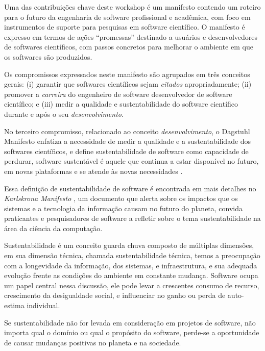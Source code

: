 Uma das contribuições chave deste workshop é um manifesto contendo um roteiro
para o futuro da engenharia de software profissional e acadêmica, com foco em
instrumentos de suporte para pesquisas em software científico. O manifesto é
expresso em termos de ações ``promessas'' destinado a usuários e
desenvolvedores de softwares científicos, com passos concretos para melhorar o
ambiente em que os softwares são produzidos.

Os compromissos expressados neste manifesto são agrupados em três conceitos gerais:
(i) garantir que softwares científicos sejam {\it citados} apropriadamente;
(ii) promover a {\it carreira} do engenheiro de software desenvolvedor de software científico; e
(iii) medir a qualidade e sustentabilidade do software científico durante e após o seu {\it desenvolvimento}.

No terceiro compromisso, relacionado ao conceito {\it desenvolvimento}, o Dagstuhl Manifesto enfatiza a necessidade de medir a
qualidade e a sustentabilidade dos softwares científicos, e define
sustentabilidade de software como capacidade de perdurar, software sustentável
é aquele que continua a estar disponível no futuro, em novas plataformas e se
atende às novas necessidades \cite{allen2017engineering}.


Essa definição de sustentabilidade de software é encontrada em mais detalhes no
{\it Karlskrona Manifesto} \cite{becker2014karlskrona}, um documento que alerta
sobre os impactos que os sistemas e a tecnologia da informação causam no futuro
do planeta, convida praticantes e pesquisadores de software a refletir sobre
o tema sustentabilidade na área da ciência da computação.

Sustentabilidade é um conceito guarda chuva composto de múltiplas dimensões, em
sua dimensão técnica, chamada sustentabilidade técnica, temos a preocupação com
a longevidade da informação, dos sistemas, e infraestrutura, e sua adequada
evolução frente as condições do ambiente em constante mudança. Software ocupa
um papel central nessa discussão, ele pode levar a crescentes consumo de
recurso, crescimento da desigualdade social, e influenciar no ganho ou perda de
auto-estima individual.

Se sustentabilidade não for levada em consideração em projetos de software, não
importa qual o domínio ou qual o propósito do software, perde-se a oportunidade
de causar mudanças positivas no planeta e na sociedade.

